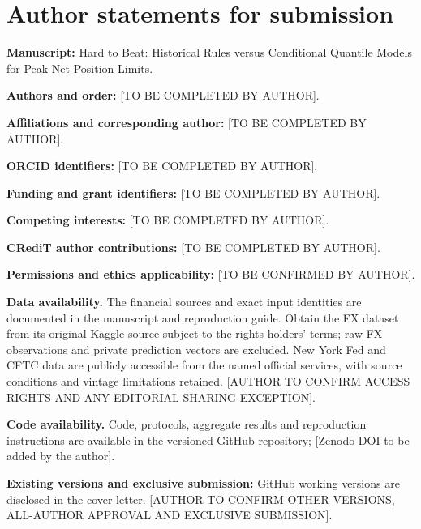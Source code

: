 \documentclass[11pt,a4paper]{article}
\begin{document}
\section*{Author statements for submission}
\textbf{Manuscript:} Hard to Beat: Historical Rules versus Conditional Quantile Models for Peak Net-Position Limits.

\textbf{Authors and order:} [TO BE COMPLETED BY AUTHOR].

\textbf{Affiliations and corresponding author:} [TO BE COMPLETED BY AUTHOR].

\textbf{ORCID identifiers:} [TO BE COMPLETED BY AUTHOR].

\textbf{Funding and grant identifiers:} [TO BE COMPLETED BY AUTHOR].

\textbf{Competing interests:} [TO BE COMPLETED BY AUTHOR].

\textbf{CRediT author contributions:} [TO BE COMPLETED BY AUTHOR].

\textbf{Permissions and ethics applicability:} [TO BE CONFIRMED BY AUTHOR].

\textbf{Data availability.} The financial sources and exact input identities are documented in the manuscript and reproduction guide. Obtain the FX dataset from its original Kaggle source subject to the rights holders' terms; raw FX observations and private prediction vectors are excluded. New York Fed and CFTC data are publicly accessible from the named official services, with source conditions and vintage limitations retained. [AUTHOR TO CONFIRM ACCESS RIGHTS AND ANY EDITORIAL SHARING EXCEPTION].

\textbf{Code availability.} Code, protocols, aggregate results and reproduction instructions are available in the \href{https://github.com/ByronLi0207/financial-mathematics-paper-20261020/tree/submission-final}{versioned GitHub repository}; [Zenodo DOI to be added by the author].

\textbf{Existing versions and exclusive submission:} GitHub working versions are disclosed in the cover letter. [AUTHOR TO CONFIRM OTHER VERSIONS, ALL-AUTHOR APPROVAL AND EXCLUSIVE SUBMISSION].
\end{document}
